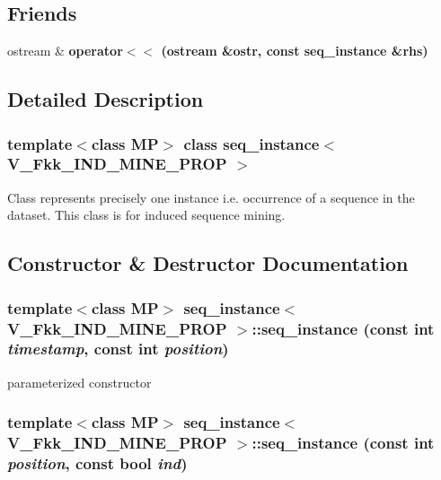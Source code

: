 \subsection*{Friends}
\begin{CompactItemize}
\item 
ostream \& \bf{operator$<$$<$} (ostream \&ostr, const \bf{seq\_\-instance} \&rhs)
\end{CompactItemize}


\subsection{Detailed Description}
\subsubsection*{template$<$class MP$>$ class seq\_\-instance$<$ V\_\-Fkk\_\-IND\_\-MINE\_\-PROP $>$}

Class represents precisely one instance i.e. occurrence of a sequence in the dataset. This class is for induced sequence mining. 



\subsection{Constructor \& Destructor Documentation}
\subsubsection{\setlength{\rightskip}{0pt plus 5cm}template$<$class MP$>$ \bf{seq\_\-instance}$<$ V\_\-Fkk\_\-IND\_\-MINE\_\-PROP $>$::\bf{seq\_\-instance} (const int {\em timestamp}, const int {\em position})\hspace{0.3cm}{\tt  [inline]}}\label{classseq__instance_3_01V__Fkk__IND__MINE__PROP_01_4_c10031e99f7ea94675a2acb37808b30f}


parameterized constructor 
\subsubsection{\setlength{\rightskip}{0pt plus 5cm}template$<$class MP$>$ \bf{seq\_\-instance}$<$ V\_\-Fkk\_\-IND\_\-MINE\_\-PROP $>$::\bf{seq\_\-instance} (const int {\em position}, const bool {\em ind})\hspace{0.3cm}{\tt  [inline]}}\label{classseq__instance_3_01V__Fkk__IND__MINE__PROP_01_4_9657a1d9da95318f26a425d489535d03}


